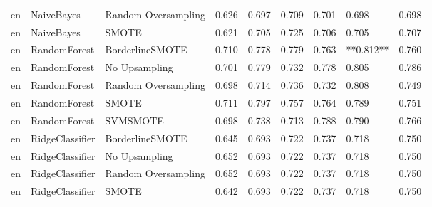 \begin{tabular}{lllllllll}
      en &                   NaiveBayes & Random Oversampling & 0.626 &                     0.697 &                 0.709 &                  0.701 &                                   0.698 &     0.698 \\
      en &                   NaiveBayes &               SMOTE & 0.621 &                     0.705 &                 0.725 &                  0.706 &                                   0.705 &     0.707 \\
      en &                 RandomForest &     BorderlineSMOTE & 0.710 &                     0.778 &                 0.779 &                  0.763 &                               **0.812** &     0.760 \\
      en &                 RandomForest &       No Upsampling & 0.701 &                     0.779 &                 0.732 &                  0.778 &                                   0.805 &     0.786 \\
      en &                 RandomForest & Random Oversampling & 0.698 &                     0.714 &                 0.736 &                  0.732 &                                   0.808 &     0.749 \\
      en &                 RandomForest &               SMOTE & 0.711 &                     0.797 &                 0.757 &                  0.764 &                                   0.789 &     0.751 \\
      en &                 RandomForest &            SVMSMOTE & 0.698 &                     0.738 &                 0.713 &                  0.788 &                                   0.790 &     0.766 \\
      en &              RidgeClassifier &     BorderlineSMOTE & 0.645 &                     0.693 &                 0.722 &                  0.737 &                                   0.718 &     0.750 \\
      en &              RidgeClassifier &       No Upsampling & 0.652 &                     0.693 &                 0.722 &                  0.737 &                                   0.718 &     0.750 \\
      en &              RidgeClassifier & Random Oversampling & 0.652 &                     0.693 &                 0.722 &                  0.737 &                                   0.718 &     0.750 \\
      en &              RidgeClassifier &               SMOTE & 0.642 &                     0.693 &                 0.722 &                  0.737 &                                   0.718 &     0.750 \\

\end{tabular}
